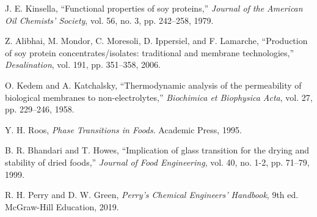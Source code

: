 \documentclass[10pt,letterpaper,twocolumn]{article}
\begin{document}
\begin{enumerate}[label={[\arabic*]}, leftmargin=*]
    \item J. E. Kinsella, ``Functional properties of soy proteins,'' \textit{Journal of the American Oil Chemists' Society}, vol. 56, no. 3, pp. 242--258, 1979.
    \item Z. Alibhai, M. Mondor, C. Moresoli, D. Ippersiel, and F. Lamarche, ``Production of soy protein concentrates/isolates: traditional and membrane technologies,'' \textit{Desalination}, vol. 191, pp. 351--358, 2006.
    \item O. Kedem and A. Katchalsky, ``Thermodynamic analysis of the permeability of biological membranes to non-electrolytes,'' \textit{Biochimica et Biophysica Acta}, vol. 27, pp. 229--246, 1958.
    \item Y. H. Roos, \textit{Phase Transitions in Foods}. Academic Press, 1995.
    \item B. R. Bhandari and T. Howes, ``Implication of glass transition for the drying and stability of dried foods,'' \textit{Journal of Food Engineering}, vol. 40, no. 1-2, pp. 71--79, 1999.
    \item R. H. Perry and D. W. Green, \textit{Perry's Chemical Engineers' Handbook}, 9th ed. McGraw-Hill Education, 2019.
\end{enumerate}
\end{document}
